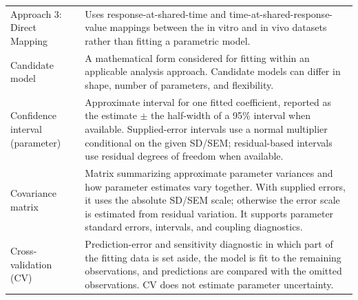 \begin{longtable}{@{}>{\raggedright\arraybackslash}p{}>{\raggedright\arraybackslash}p{}@{}}
Approach 3: Direct Mapping & Uses response-at-shared-time and time-at-shared-response-value mappings between the in vitro and in vivo datasets rather than fitting a parametric model. \\


Candidate model & A mathematical form considered for fitting within an applicable analysis approach. Candidate models can differ in shape, number of parameters, and flexibility. \\


Confidence interval (parameter) & Approximate interval for one fitted coefficient, reported as the estimate \(\pm\) the half-width of a 95\% interval when available. Supplied-error intervals use a normal multiplier conditional on the given SD/SEM; residual-based intervals use residual degrees of freedom when available. \\

Covariance matrix & Matrix summarizing approximate parameter variances and how parameter estimates vary together. With supplied errors, it uses the absolute SD/SEM scale; otherwise the error scale is estimated from residual variation. It supports parameter standard errors, intervals, and coupling diagnostics. \\

Cross-validation (CV) & Prediction-error and sensitivity diagnostic in which part of the fitting data is set aside, the model is fit to the remaining observations, and predictions are compared with the omitted observations. CV does not estimate parameter uncertainty. \\



\end{longtable}
